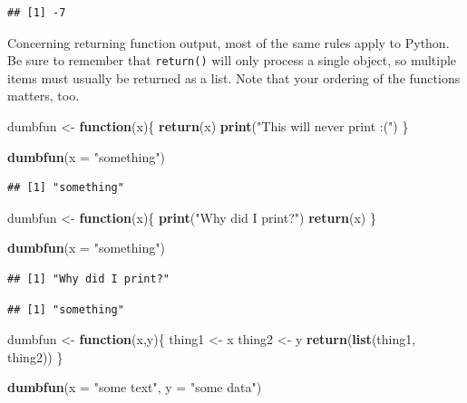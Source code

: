 \documentclass[
]{book}
\newenvironment{Shaded}{\begin{snugshade}}{\end{snugshade}}
\newcommand{\AttributeTok}[1]{\textcolor[rgb]{0.13,0.29,0.53}{#1}}
\newcommand{\ControlFlowTok}[1]{\textcolor[rgb]{0.13,0.29,0.53}{\textbf{#1}}}
\newcommand{\FunctionTok}[1]{\textcolor[rgb]{0.13,0.29,0.53}{\textbf{#1}}}
\newcommand{\NormalTok}[1]{#1}
\newcommand{\OtherTok}[1]{\textcolor[rgb]{0.56,0.35,0.01}{#1}}
\newcommand{\StringTok}[1]{\textcolor[rgb]{0.31,0.60,0.02}{#1}}
\begin{document}
\begin{verbatim}
## [1] -7
\end{verbatim}

Concerning returning function output, most of the same rules apply to Python. Be sure to remember that \texttt{return()} will only process a single object, so multiple items must usually be returned as a list. Note that your ordering of the functions matters, too.

\begin{Shaded}
\begin{Highlighting}[]
\NormalTok{dumbfun }\OtherTok{\textless{}{-}} \ControlFlowTok{function}\NormalTok{(x)\{}
  \FunctionTok{return}\NormalTok{(x)}
  \FunctionTok{print}\NormalTok{(}\StringTok{"This will never print :("}\NormalTok{)}
\NormalTok{\}}

\FunctionTok{dumbfun}\NormalTok{(}\AttributeTok{x =} \StringTok{"something"}\NormalTok{)}
\end{Highlighting}
\end{Shaded}

\begin{verbatim}
## [1] "something"
\end{verbatim}

\begin{Shaded}
\begin{Highlighting}[]
\NormalTok{dumbfun }\OtherTok{\textless{}{-}} \ControlFlowTok{function}\NormalTok{(x)\{}
  \FunctionTok{print}\NormalTok{(}\StringTok{"Why did I print?"}\NormalTok{)}
  \FunctionTok{return}\NormalTok{(x)}
\NormalTok{\}}

\FunctionTok{dumbfun}\NormalTok{(}\AttributeTok{x =} \StringTok{"something"}\NormalTok{)}
\end{Highlighting}
\end{Shaded}

\begin{verbatim}
## [1] "Why did I print?"
\end{verbatim}

\begin{verbatim}
## [1] "something"
\end{verbatim}

\begin{Shaded}
\begin{Highlighting}[]
\NormalTok{dumbfun }\OtherTok{\textless{}{-}} \ControlFlowTok{function}\NormalTok{(x,y)\{}
\NormalTok{  thing1 }\OtherTok{\textless{}{-}}\NormalTok{ x}
\NormalTok{  thing2 }\OtherTok{\textless{}{-}}\NormalTok{ y}
  \FunctionTok{return}\NormalTok{(}\FunctionTok{list}\NormalTok{(thing1, thing2))}
\NormalTok{\}}

\FunctionTok{dumbfun}\NormalTok{(}\AttributeTok{x =} \StringTok{"some text"}\NormalTok{, }\AttributeTok{y =} \StringTok{"some data"}\NormalTok{)}
\end{Highlighting}
\end{Shaded}
\end{document}
